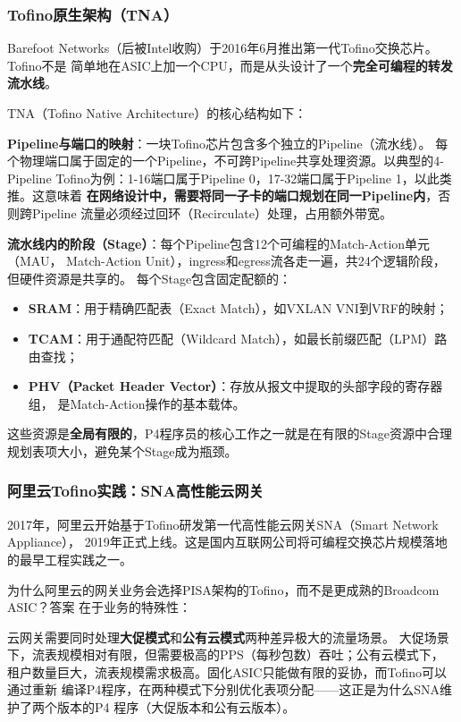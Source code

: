 \subsubsection{Tofino原生架构（TNA）}

Barefoot Networks（后被Intel收购）于2016年6月推出第一代Tofino交换芯片。Tofino不是
简单地在ASIC上加一个CPU，而是从头设计了一个\textbf{完全可编程的转发流水线}。

TNA（Tofino Native Architecture）的核心结构如下：

\textbf{Pipeline与端口的映射}：一块Tofino芯片包含多个独立的Pipeline（流水线）。
每个物理端口属于固定的一个Pipeline，不可跨Pipeline共享处理资源。以典型的4-Pipeline
Tofino为例：1-16端口属于Pipeline 0，17-32端口属于Pipeline 1，以此类推。这意味着
\textbf{在网络设计中，需要将同一子卡的端口规划在同一Pipeline内}，否则跨Pipeline
流量必须经过回环（Recirculate）处理，占用额外带宽。

\textbf{流水线内的阶段（Stage）}：每个Pipeline包含12个可编程的Match-Action单元（MAU，
Match-Action Unit），ingress和egress流各走一遍，共24个逻辑阶段，但硬件资源是共享的。
每个Stage包含固定配额的：
\begin{itemize}
  \item \textbf{SRAM}：用于精确匹配表（Exact Match），如VXLAN VNI到VRF的映射；
  \item \textbf{TCAM}：用于通配符匹配（Wildcard Match），如最长前缀匹配（LPM）路由查找；
  \item \textbf{PHV（Packet Header Vector）}：存放从报文中提取的头部字段的寄存器组，
    是Match-Action操作的基本载体。
\end{itemize}

这些资源是\textbf{全局有限的}，P4程序员的核心工作之一就是在有限的Stage资源中合理
规划表项大小，避免某个Stage成为瓶颈。

\subsubsection{阿里云Tofino实践：SNA高性能云网关}

2017年，阿里云开始基于Tofino研发第一代高性能云网关SNA（Smart Network Appliance），
2019年正式上线。这是国内互联网公司将可编程交换芯片规模落地的最早工程实践之一。

为什么阿里云的网关业务会选择PISA架构的Tofino，而不是更成熟的Broadcom ASIC？答案
在于业务的特殊性：

云网关需要同时处理\textbf{大促模式}和\textbf{公有云模式}两种差异极大的流量场景。
大促场景下，流表规模相对有限，但需要极高的PPS（每秒包数）吞吐；公有云模式下，
租户数量巨大，流表规模需求极高。固化ASIC只能做有限的妥协，而Tofino可以通过重新
编译P4程序，在两种模式下分别优化表项分配——这正是为什么SNA维护了两个版本的P4
程序（大促版本和公有云版本）。

